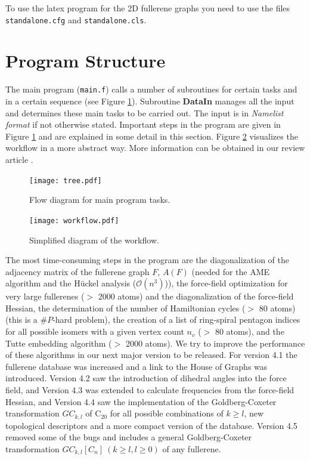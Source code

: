 \documentclass[article,a4paper,twoside]{memoir}
\newcommand{\C}[1]{\ensuremath{\mathrm{C}_{#1}}}
\newcommand{\filename}[1]{\texttt{#1}}
\newcommand{\funname}[1]{{\color{blue}\textbf{#1}}}
\begin{document}
To use the latex program for the 2D fullerene graphs you need to use the files \filename{standalone.cfg} and \filename{standalone.cls}.

\clearpage
\section{Program Structure}
The main program (\filename{main.f}) calls a number of subroutines for certain tasks and in a certain sequence (see Figure \ref{pic:flow_long}).
Subroutine \funname{DataIn} manages all the input and determines these main tasks to be carried out.
The input is in \textit{Namelist format} if not otherwise stated. 
Important steps in the program are given in Figure \ref{pic:flow_long} and are
explained in some detail in this section. Figure \ref{pic:flow_short} visualizes the workflow in a more abstract way.
More information can be obtained in our review article \cite{WIRE2015}.

\begin{figure}[htbp]
   	\centering
	\texttt{[image: tree.pdf]} 
    \caption{Flow diagram for main program tasks.}
    \label{pic:flow_long}
\end{figure}

\begin{figure}[htbp]
   	\centering
	\texttt{[image: workflow.pdf]} 
    \caption{Simplified diagram of the workflow.}
    \label{pic:flow_short}
\end{figure}

The most time-consuming steps in the program are the diagonalization of the adjacency matrix 
of the fullerene graph $F$, $A(F)$  
(needed for the AME algorithm and the H\"uckel analysis ($\mathcal{O}(n^3)$)), the force-field optimization for
very large fullerenes ($>$ 2000 atoms)  and the diagonalization of
the force-field Hessian, the determination of the number of Hamiltonian cycles
($>$ 80 atoms) (this is a $\#P$-hard problem), the creation of a list of ring-spiral pentagon
indices for all possible isomers with a given vertex count $n_v$ ($>$ 80 atoms), 
and the Tutte embedding algorithm ($>$ 2000 atoms). We try to improve the performance of these algorithms
in our next major version to be released. For version 4.1 the fullerene database was increased and a link to
the House of Graphs was introduced. Version 4.2 saw the introduction of dihedral angles into the force field,
and Version 4.3 was extended to calculate frequencies from the force-field Hessian, and Version 4.4 saw
the implementation of the Goldberg-Coxeter transformation $GC_{k,l}$ of \C{20} for all possible combinations of $k \geq l$,
new topological descriptors and a more compact version of the database. Version 4.5 removed some of the bugs and includes
a general Goldberg-Coxeter transformation $GC_{k,l}[C_n] ~(k\ge l, l\ge 0)$ of any fullerene.
\end{document}
